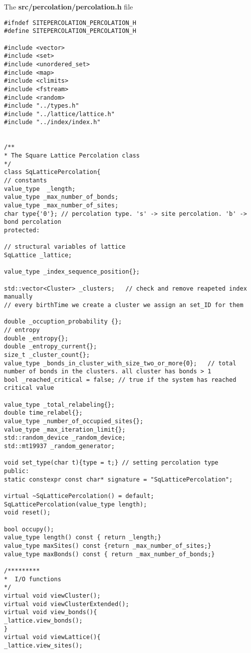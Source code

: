 
The \textbf{src/percolation/percolation.h} file

\begin{lstlisting}[style=CStyle]
#ifndef SITEPERCOLATION_PERCOLATION_H
#define SITEPERCOLATION_PERCOLATION_H

#include <vector>
#include <set>
#include <unordered_set>
#include <map>
#include <climits>
#include <fstream>
#include <random>
#include "../types.h"
#include "../lattice/lattice.h"
#include "../index/index.h"


/**
* The Square Lattice Percolation class
*/
class SqLatticePercolation{
// constants
value_type  _length;
value_type _max_number_of_bonds;
value_type _max_number_of_sites;
char type{'0'}; // percolation type. 's' -> site percolation. 'b' -> bond percolation
protected:

// structural variables of lattice
SqLattice _lattice;

value_type _index_sequence_position{};

std::vector<Cluster> _clusters;   // check and remove reapeted index manually
// every birthTime we create a cluster we assign an set_ID for them

double _occuption_probability {};
// entropy
double _entropy{};
double _entropy_current{};
size_t _cluster_count{};
value_type _bonds_in_cluster_with_size_two_or_more{0};   // total number of bonds in the clusters. all cluster has bonds > 1
bool _reached_critical = false; // true if the system has reached critical value

value_type _total_relabeling{};
double time_relabel{};
value_type _number_of_occupied_sites{};
value_type _max_iteration_limit{};
std::random_device _random_device;
std::mt19937 _random_generator;

void set_type(char t){type = t;} // setting percolation type
public:
static constexpr const char* signature = "SqLatticePercolation";

virtual ~SqLatticePercolation() = default;
SqLatticePercolation(value_type length);
void reset();

bool occupy();
value_type length() const { return _length;}
value_type maxSites() const {return _max_number_of_sites;}
value_type maxBonds() const { return _max_number_of_bonds;}

/*********
*  I/O functions
*/
virtual void viewCluster();
virtual void viewClusterExtended();
virtual void view_bonds(){
_lattice.view_bonds();
}
virtual void viewLattice(){
_lattice.view_sites();


\end{lstlisting}
